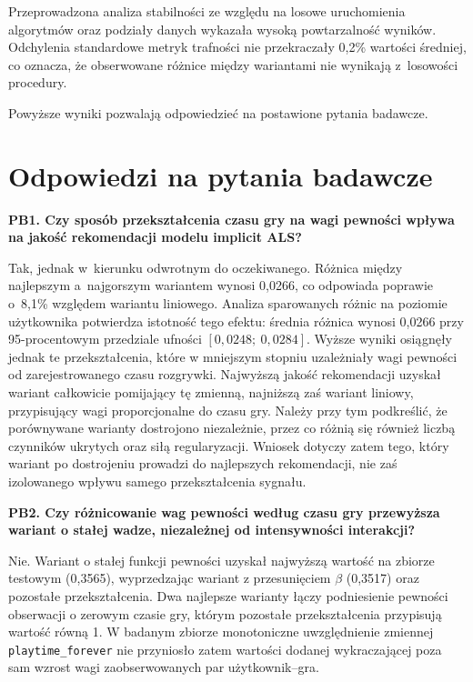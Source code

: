 Przeprowadzona analiza stabilności ze względu na losowe uruchomienia algorytmów oraz podziały danych wykazała wysoką powtarzalność wyników. Odchylenia standardowe metryk trafności nie przekraczały 0,2\% wartości średniej, co oznacza, że obserwowane różnice między wariantami nie wynikają z~losowości procedury.

Powyższe wyniki pozwalają odpowiedzieć na postawione pytania badawcze.

\section{Odpowiedzi na pytania badawcze}

\textbf{PB1. Czy sposób przekształcenia czasu gry na wagi pewności wpływa na jakość rekomendacji modelu implicit ALS?}

Tak, jednak w~kierunku odwrotnym do oczekiwanego. Różnica \ndcg{} między najlepszym a~najgorszym wariantem wynosi 0,0266, co odpowiada poprawie o~8,1\% względem wariantu liniowego. Analiza sparowanych różnic na poziomie użytkownika potwierdza istotność tego efektu: średnia różnica wynosi 0,0266 przy 95-procentowym przedziale ufności $[0{,}0248;\ 0{,}0284]$. Wyższe wyniki osiągnęły jednak te przekształcenia, które w mniejszym stopniu uzależniały wagi pewności od zarejestrowanego czasu rozgrywki. Najwyższą jakość rekomendacji uzyskał wariant całkowicie pomijający tę zmienną, najniższą zaś wariant liniowy, przypisujący wagi proporcjonalne do czasu gry. Należy przy tym podkreślić, że porównywane warianty dostrojono niezależnie, przez co różnią się również liczbą czynników ukrytych oraz siłą regularyzacji. Wniosek dotyczy zatem tego, który wariant po dostrojeniu prowadzi do najlepszych rekomendacji, nie zaś izolowanego wpływu samego przekształcenia sygnału.

\textbf{PB2. Czy różnicowanie wag pewności według czasu gry przewyższa wariant o stałej wadze, niezależnej od intensywności interakcji?}

Nie. Wariant o stałej funkcji pewności uzyskał najwyższą wartość \ndcg{} na zbiorze testowym (0,3565), wyprzedzając wariant z przesunięciem $\beta$ (0,3517) oraz pozostałe przekształcenia. Dwa najlepsze warianty łączy podniesienie pewności obserwacji o zerowym czasie gry, którym pozostałe przekształcenia przypisują wartość równą 1. W badanym zbiorze monotoniczne uwzględnienie zmiennej \texttt{playtime\_forever} nie przyniosło zatem wartości dodanej wykraczającej poza sam wzrost wagi zaobserwowanych par użytkownik--gra.

